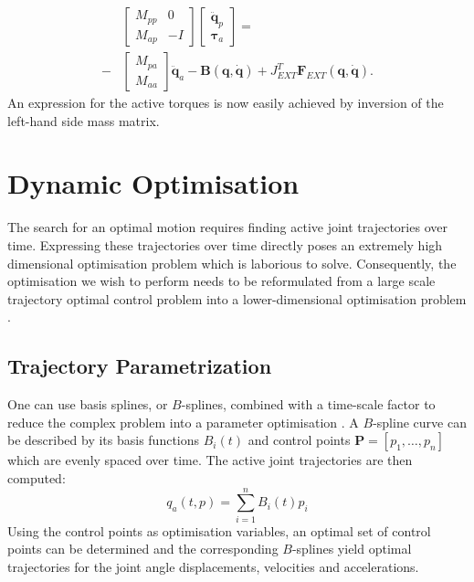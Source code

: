 \documentclass[letterpaper, 10 pt, conference]{ieeeconf}  %
\begin{document}
	\begin{equation}
	\begin{aligned}
	&\left[\begin{array}{cc}  
	M_{pp} & 0\\
	M_{ap} &-I
	\end{array} \right]
	\left[\begin{array}{c}  
	\mathbf{\ddot q}_p\\
	\boldsymbol{\tau}_a
	\end{array} \right] =\\ 
	-&
	\left[\begin{array}{c}  
	M_{pa}\\
	M_{aa}
	\end{array} \right] 
	\mathbf{\ddot q}_a-
	\mathbf{B(q, \dot q)}+
	J_{EXT}^T\mathbf{F}_{EXT}\mathbf{(q, \dot q)}.
	\end{aligned}
	\end{equation}	
	An expression for the active torques is now easily achieved by inversion of the left-hand side mass matrix. 
	
	\section{Dynamic Optimisation} \label{sec:dynamicOptimisation}
	
	The search for an optimal motion requires finding active joint trajectories over time. Expressing these trajectories over time directly poses an extremely high dimensional optimisation problem which is laborious to solve. Consequently, the optimisation we wish to perform needs to be reformulated from a large scale trajectory optimal control problem into a lower-dimensional optimisation problem \cite{kaphle2008optimality}.
	
	
	\subsection{Trajectory Parametrization}
	
	One can use basis splines, or $B$-splines, combined with a time-scale factor to reduce the complex problem into a parameter optimisation \cite{ude2000planning,babivc2009biarticulated,wang1999weight,albro2001optimal}. A $B$-spline curve can be described by its basis functions $B_i(t)$ and control points $\mathbf{P}=\left[p_1,\dots,p_n\right]$ which are evenly spaced over time. The active joint trajectories are then computed:   
	\begin{equation}
	q_a(t,p) = \sum_{i=1}^{n} B_i (t) p_i
	\end{equation}
	Using the control points as optimisation variables, an optimal set of control points can be determined and the corresponding $B$-splines yield optimal trajectories for the joint angle displacements, velocities and accelerations. 
	
\end{document}
